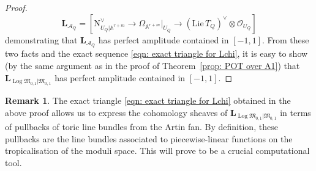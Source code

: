 \documentclass[11pt]{amsart}
\theoremstyle{definition}
\theoremstyle{definition}
\newtheorem{remark}[theorem]{Remark}
\newcommand{\LL}{\mathbf{L}}
\newcommand{\Aaff}{\mathbb{A}}
\newcommand{\OO}{\mathcal{O}}
\newcommand{\Acal}{\mathcal{A}}
\newcommand{\Mfrak}{\mathfrak{M}}
\newcommand{\Log}{\operatorname{Log}}
\begin{document}
\begin{proof}
\begin{equation*} \LL_{\Acal_Q} = [\mathrm{N}^\vee_{U_Q|\Aaff^{r+m}} \to \Omega_{\Aaff^{r+m}}|_{U_Q} \to (\mathrm{Lie}\, T_Q)^\vee \otimes \OO_{U_Q} ]\end{equation*}
demonstrating that $\LL_{\Acal_Q}$ has perfect amplitude contained in $[-1,1]$. From these two facts and the exact sequence \eqref{eqn: exact triangle for Lchi}, it is easy to show (by the same argument as in the proof of Theorem~\ref{prop: POT over A1}) that $\LL_{\Log\Mfrak_{0,1}|\Mfrak_{0,1}}$ has perfect amplitude contained in $[-1,1]$. \end{proof}

\begin{remark} The exact triangle \eqref{eqn: exact triangle for Lchi} obtained in the above proof allows us to express the cohomology sheaves of $\LL_{\Log\Mfrak_{0,1}|\Mfrak_{0,1}}$ in terms of pullbacks of toric line bundles from the Artin fan. By definition, these pullbacks are the line bundles associated to piecewise-linear functions on the tropicalisation of the moduli space. This will prove to be a crucial computational tool.\end{remark}
\end{document}
